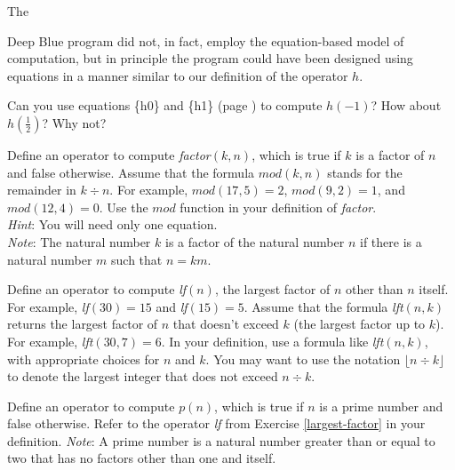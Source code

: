 The {Deep Blue program did not, in fact,
employ the equation-based model of computation,
but in principle the program could have been designed
using equations in a manner similar to our definition of the operator $h$.

\begin{ExerciseList}
\Exercise Can you use equations \{h0\} and \{h1\}
(page \pageref{reciprocalsdef})
to compute $h(-1)$?  How about $h(\frac{1}{2})$? Why not?

\Exercise Define an operator to compute \emph{factor}$(k, n)$, which is true
if $k$ is a factor of $n$ and false otherwise.
Assume that the formula $mod(k,n)$ stands for the remainder
in $k \div n$.
For example, $mod(17,5)=2$, $mod(9,2)=1$, and $mod(12,4)=0$.
Use the $mod$ function in your definition of \emph{factor}.\\
\emph{Hint}: You will need only one equation.\\
\emph{Note}: The natural number $k$ is a factor of the natural number $n$
if there is a natural number $m$ such that $n = km$.

\Exercise \label{largest-factor}
        Define an operator to compute \emph{lf}$(n)$,
        the largest factor of $n$ other than $n$ itself.
        For example, \emph{lf}$(30)=15$ and
        \emph{lf}$(15)=5$.
        Assume that the formula
        \emph{lft}$(n,k)$  returns the largest factor of
        $n$ that doesn't exceed $k$ (the largest factor up to $k$).
        For example, \emph{lft}$(30,7)=6$.
        In your definition, use a formula like \emph{lft}$(n,k)$,
        with appropriate choices for $n$ and $k$.
        You may want to use the notation $\lfloor n \div k\rfloor$
        to denote the largest integer that does not exceed $n \div k$.

\Exercise \label{prime-predicate}
        Define an operator to compute $p(n)$, which is true
        if $n$ is a prime number and false otherwise.
        Refer to the operator \emph{lf}
        from Exercise \ref{largest-factor} in your definition.
        \emph{Note}: A prime number is a natural number greater than or equal to two
        that has no factors other than one and itself.


\end{ExerciseList}}
